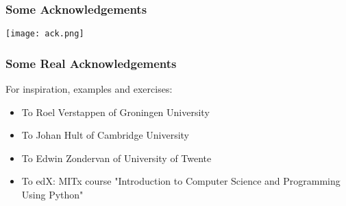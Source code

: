
\begin{frame}
 \frametitle{Some Acknowledgements}
 \centering\texttt{[image: ack.png]}
\end{frame}

\begin{frame}
 \frametitle{Some Real Acknowledgements}
 For inspiration, examples and exercises:
 \begin{itemize}
  \item To Roel Verstappen of Groningen University
  \item To Johan Hult of Cambridge University
  \item To Edwin Zondervan of University of Twente
  \item To edX: MITx course  "Introduction to Computer Science and Programming Using Python"
 \end{itemize}
\end{frame}
% 



